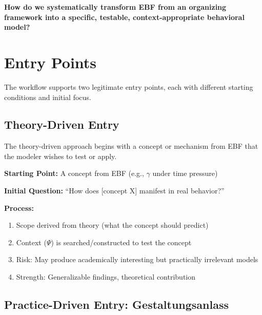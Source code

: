 \begin{tcolorbox}[colback=red!5!white, colframe=red!75!black,
    title=The Fundamental Question]
\textbf{How do we systematically transform EBF from an organizing framework into
a specific, testable, context-appropriate behavioral model?}
\end{tcolorbox}


\section{Entry Points}
\label{sec:eee-entry}

The workflow supports two legitimate entry points, each with different starting
conditions and initial focus.

\subsection{Theory-Driven Entry}

The theory-driven approach begins with a concept or mechanism from EBF that
the modeler wishes to test or apply.

\begin{tcolorbox}[colback=gray!5!white, colframe=gray!75!black,
    title=Theory-Driven Entry]
\textbf{Starting Point:} A concept from EBF (e.g., $\gamma$ under time pressure)

\textbf{Initial Question:} ``How does [concept X] manifest in real behavior?''

\textbf{Process:}
\begin{enumerate}[nosep]
\item Scope derived from theory (what the concept should predict)
\item Context ($\Psi$) is searched/constructed to test the concept
\item Risk: May produce academically interesting but practically irrelevant models
\item Strength: Generalizable findings, theoretical contribution
\end{enumerate}
\end{tcolorbox}

\subsection{Practice-Driven Entry: Gestaltungsanlass}


